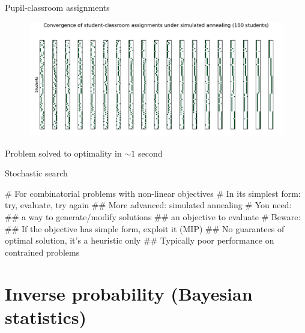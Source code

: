 \documentclass[12pt, aspectratio=149]{beamer}
\theoremstyle{plain}
\begin{document}
\begin{frame}[fragile]{Pupil-classroom assignments}
\vspace*{-1.5em}
\begin{center}
 \begin{figure}
    	\centering
    	\includegraphics[width=0.99\linewidth]{figures/classroom_convergence.pdf}
 \end{figure}
 \end{center}
\vspace*{-2em}
\begin{center}
Problem solved to optimality in $\sim 1$ second
\end{center}
\end{frame}


\begin{frame}[fragile]{Stochastic search}
	\begin{easylist}[itemize]
		# For combinatorial problems with non-linear objectives
		# In its simplest form: try, evaluate, try again
		## More advanced: simulated annealing
		# You need: 
		## a way to generate/modify solutions
		## an objective to evaluate
		# Beware:
		## If the objective has simple form, exploit it (MIP)
		## No guarantees of optimal solution, it's a heuristic only
		## Typically poor performance on contrained problems
	\end{easylist}
\end{frame}




\section{Inverse probability (Bayesian statistics)}
\end{document}
